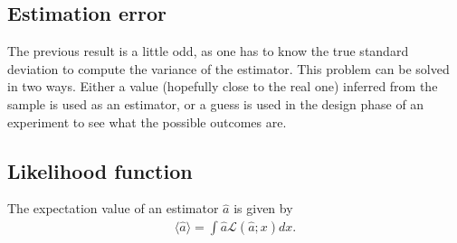 {\subsection{Estimation error}

    \begin{remark}
        The previous result is a little odd, as one has to know the true standard deviation to compute the variance of the estimator. This problem can be solved in two ways. Either a value (hopefully close to the real one) inferred from the sample is used as an estimator, or a guess is used in the design phase of an experiment to see what the possible outcomes are.
    \end{remark}

\subsection{Likelihood function}


    \begin{property}
        The expectation value of an estimator $\hat{a}$ is given by
        \begin{gather}
            \langle\hat{a}\rangle = \int\hat{a}\mathcal{L}(\hat{a};x)dx.
        \end{gather}
    \end{property}

}
